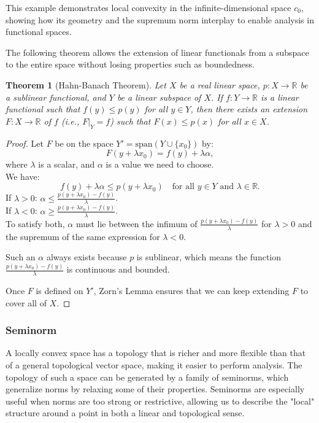 \documentclass[12pt, reqno]{amsart}
\newtheorem{theorem}{Theorem}[section]
\theoremstyle{definition}
\numberwithin{equation}{section}
\newcommand{\dR}{{\mathbb R}}
\begin{document}
This example demonstrates local convexity in the infinite-dimensional space \( c_0 \), showing how its geometry and the supremum norm interplay to enable analysis in functional spaces.

The following theorem allows the extension of linear functionals from a subspace to the entire space without losing properties such as boundedness. 

\begin{theorem} [Hahn-Banach Theorem]
Let $X$ be a real linear space, $p: X \rightarrow \dR$ be a sublinear functional, and $Y$ be a linear subspace of $X$. If $f: Y \rightarrow \dR$ is a linear functional such that $f(y) \leq p(y)$ for all $y \in Y$, then there exists an extension $F: X \rightarrow \dR$ of $f$ (i.e., $F|_Y = f$) such that $F(x) \leq p(x)$ for all $x \in X$.
\end{theorem}

\begin{proof}
Let $F$ be on the space $Y' = \text{span}(Y \cup \{x_0\})$ by:
\[
F(y + \lambda x_0) = f(y) + \lambda \alpha,
\]
where $\lambda$ is a scalar, and $\alpha$ is a value we need to choose.\\
We have:
\[
f(y) + \lambda \alpha \leq p(y + \lambda x_0) \quad \text{for all } y \in Y \text{ and } \lambda \in \dR.
\]
If $\lambda > 0$: $\alpha \leq \frac{p(y + \lambda x_0) - f(y)}{\lambda}$.\\
If $\lambda < 0$: $\alpha \geq \frac{p(y + \lambda x_0) - f(y)}{\lambda}$.\\
To satisfy both, $\alpha$ must lie between the infimum of $\frac{p(y + \lambda x_0) - f(y)}{\lambda}$ for $\lambda > 0$ and the supremum of the same expression for $\lambda < 0$.

Such an $\alpha$ always exists because $p$ is sublinear, which means the function $\frac{p(y + \lambda x_0) - f(y)}{\lambda}$ is continuous and bounded.

Once $F$ is defined on $Y'$, Zorn's Lemma ensures that we can keep extending $F$ to cover all of $X$.
\end{proof}


\subsubsection{Seminorm}
A locally convex space has a topology that is richer and more flexible than that of a general topological vector space, making it easier to perform analysis. The topology of such a space can be generated by a family of seminorms, which generalize norms by relaxing some of their properties. Seminorms are especially useful when norms are too strong or restrictive, allowing us to describe the "local" structure around a point in both a linear and topological sense.
\end{document}
